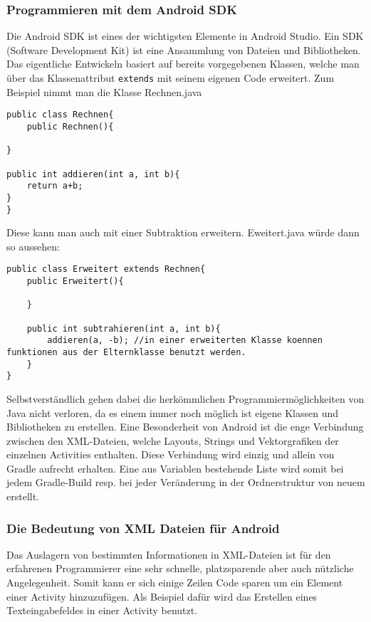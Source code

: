 \subsubsection{Programmieren mit dem Android SDK}
Die Android SDK ist eines der wichtigsten Elemente in Android Studio. Ein SDK (Software Development Kit) ist eine Ansammlung von Dateien und Bibliotheken. Das eigentliche Entwickeln basiert auf bereits vorgegebenen Klassen, welche man über das Klassenattribut \verb|extends|  mit seinem eigenen Code erweitert. Zum Beispiel nimmt man die Klasse Rechnen.java
\begin{lstlisting}
public class Rechnen{
    public Rechnen(){

}

public int addieren(int a, int b){
    return a+b;
}
}
\end{lstlisting}
Diese kann man auch mit einer Subtraktion erweitern. Eweitert.java würde dann so aussehen:
\begin{lstlisting}
public class Erweitert extends Rechnen{
    public Erweitert(){

    }

    public int subtrahieren(int a, int b){
        addieren(a, -b); //in einer erweiterten Klasse koennen funktionen aus der Elternklasse benutzt werden.
    }
}
\end{lstlisting}
Selbstverständlich gehen dabei die herkömmlichen Programmiermöglichkeiten von Java nicht verloren, da es einem immer noch möglich ist eigene Klassen und Bibliotheken zu erstellen.
Eine Besonderheit von Android ist die enge Verbindung zwischen den XML-Dateien, welche Layouts, Strings und Vektorgrafiken der einzelnen Activities enthalten.
Diese Verbindung wird einzig und allein von Gradle aufrecht erhalten. Eine aus Variablen bestehende Liste wird somit bei jedem Gradle-Build resp. bei jeder Veränderung in der Ordnerstruktur von neuem erstellt.

\subsubsection{Die Bedeutung von XML Dateien für Android}

Das Auslagern von bestimmten Informationen in XML-Dateien ist für den erfahrenen Programmierer eine sehr schnelle, platzsparende aber auch nützliche Angelegenheit.
Somit kann er sich einige Zeilen Code sparen um ein Element einer Activity hinzuzufügen. Als Beispiel dafür wird das Erstellen eines Texteingabefeldes in einer Activity benutzt.

